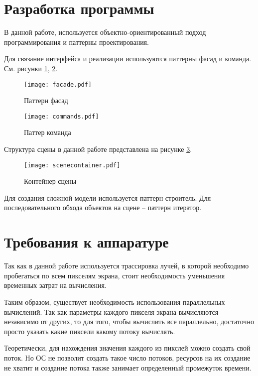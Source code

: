 \section{\textbf{Разработка программы}}

В данной работе, используется объектно-ориентированный подход программирования и паттерны проектирования\cite{patterns}. 

Для связание интерфейса и реализации используются паттерны фасад и команда. См. рисунки \ref{img:facade}, \ref{img:commands}. 

\begin{figure}[H]
	\centering
	\texttt{[image: facade.pdf]}
	\caption{Паттерн фасад}
	\label{img:facade}
\end{figure}

\begin{figure}[H]
	\centering
	\texttt{[image: commands.pdf]}
	\caption{Паттер команда}
	\label{img:commands}
\end{figure}

Структура сцены в данной работе представлена на рисунке \ref{img:scenecontainer}. 

\begin{figure}[H]
	\centering
	\texttt{[image: scenecontainer.pdf]}
	\caption{Контейнер сцены}
	\label{img:scenecontainer}
\end{figure}

Для создания сложной модели используется паттерн строитель. Для последовательного обхода объектов на сцене -- паттерн итератор. 

\section{\textbf{Требования к аппаратуре }}

Так как в данной работе используется трассировка лучей, в которой необходимо пробегаться по всем пикселям экрана, стоит необходимость уменьшения временных затрат на вычисления. 

Таким образом, существует необходимость использования параллельных вычислений. Так как параметры каждого пикселя экрана вычисляются независимо от других, то для того, чтобы вычислить все параллельно, достаточно просто указать какие пиксели какому потоку вычислять.

Теоретически, для нахождения значения каждого из пикслей можно создать свой поток. Но ОС не позволит создать такое число потоков, ресурсов на их создание не хватит и создание потока также занимает определенный промежуток времени.

